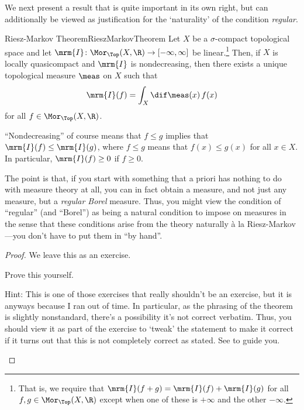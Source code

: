 \horizontalrule

We next present a result that is quite important in its own right, but can additionally be viewed as justification for the `naturality' of the condition \emph{regular}.
\begin{thm}{Riesz-Markov Theorem}{RieszMarkovTheorem}
Let $X$ be a $\sigma$-compact topological space and let $\mrm{I}\colon \Mor _{\Top}(X,\R )\rightarrow [-\infty ,\infty ]$ be linear.\footnote{That is, we require that $\mrm{I}(f+g)=\mrm{I}(f)+\mrm{I}(g)$ for all $f,g\in \Mor _{\Top}(X,\R )$ except when one of these is $+\infty$ and the other $-\infty$.}  Then, if $X$ is locally quasicompact and $\mrm{I}$ is nondecreasing, then there exists a unique topological measure $\meas$ on $X$ such that
\begin{equation}
\mrm{I}(f)=\int _X\dif \meas (x)\, f(x)
\end{equation}
for all $f\in \Mor _{\Top}(X,\R )$.
\begin{rmk}
``Nondecreasing'' of course means that $f\leq g$ implies that $\mrm{I}(f)\leq \mrm{I}(g)$, where $f\leq g$ means that $f(x)\leq g(x)$ for all $x\in X$.  In particular, $\mrm{I}(f)\geq 0$ if $f\geq 0$.
\end{rmk}
\begin{rmk}
The point is that, if you start with something that a priori has nothing to do with measure theory at all, you can in fact obtain a measure, and not just any measure, but a \emph{regular Borel} measure.  Thus, you might view the condition of ``regular'' (and ``Borel'') as being a natural condition to impose on measures in the sense that these conditions arise from the theory naturally \`{a} la Riesz-Markov---you don't have to put them in ``by hand''.
\end{rmk}
\begin{proof}
We leave this as an exercise.
\begin{exr}[breakable=false]{}{}
Prove this yourself.
\begin{rmk}
Hint:  This is one of those exercises that really shouldn't be an exercise, but it is anyways because I ran out of time.  In particular, as the phrasing of the theorem is slightly nonstandard, there's a possibility it's not correct verbatim.  Thus, you should view it as part of the exercise to `tweak' the statement to make it correct if it turns out that this is not completely correct as stated.  See \cite[Theorem 2.14]{BigRudin} to guide you.
\end{rmk}
\end{exr}
\end{proof}
\end{thm}

